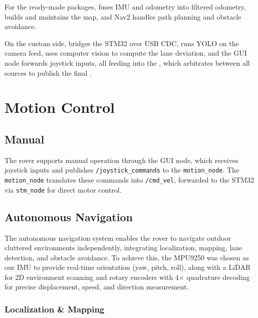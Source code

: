 \documentclass[11pt,a4paper]{article}
\begin{document}
For the ready-made packages,  fuses IMU and odometry into filtered odometry,  builds and maintains the map, and Nav2 handles path planning and obstacle avoidance.

On the custom side,  bridges the STM32 over USB CDC,  runs YOLO on the camera feed,  uses computer vision to compute the lane deviation, and the GUI node forwards joystick inputs, all feeding into the , which arbitrates between all sources to publish the final .


\section{Motion Control}

\subsection{Manual}

The rover supports manual operation through the GUI node, which receives joystick inputs and publishes \texttt{/joystick\allowbreak\_commands} to the \texttt{motion\_node}. The \texttt{motion\_node} translates these commands into \texttt{/cmd\_vel}, forwarded to the STM32 via \texttt{stm\_node} for direct motor control.


\subsection{Autonomous Navigation}

The autonomous navigation system enables the rover to navigate outdoor cluttered environments independently, integrating localization, mapping, lane detection, and obstacle avoidance. To achieve this, the MPU9250 was chosen as our IMU to provide real-time orientation (yaw, pitch, roll), along with a LiDAR for 2D environment scanning and rotary encoders with 4× quadrature decoding for precise displacement, speed, and direction measurement.

\subsubsection{Localization \& Mapping}
\end{document}
